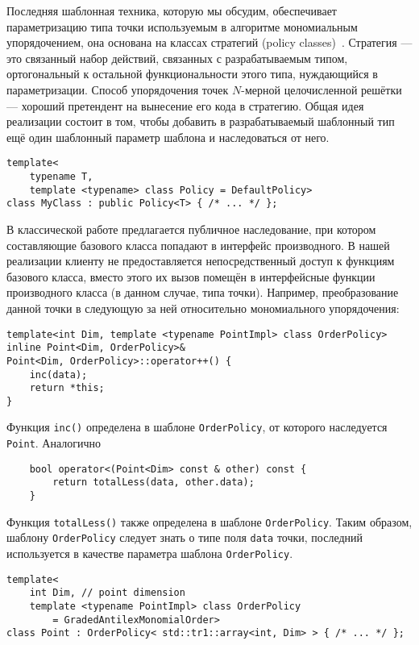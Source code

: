 \documentclass[14pt]{extarticle}
\newcommand{\nspace}{\hspace{0pt}}
\newcommand{\nbdash}{\nobreakdash-\nspace}
\begin{document}
Последняя шаблонная техника, которую мы обсудим, обеспечивает
параметризацию типа точки используемым в алгоритме мономиальным упорядочением,
она основана на классах стратегий (policy classes)~\cite[гл.~1]{Alexandrescu02}.
Стратегия — это связанный набор действий, связанных с разрабатываемым типом,
ортогональный к остальной функциональности этого типа, нуждающийся в
параметризации. Способ упорядочения точек $N$\nbdash{}мерной целочисленной
решётки — хороший претендент на вынесение его кода в стратегию. Общая идея
реализации состоит в том, чтобы добавить в разрабатываемый шаблонный тип ещё
один шаблонный параметр шаблона и наследоваться от него.
\begin{lstlisting}
template<
    typename T,
    template <typename> class Policy = DefaultPolicy>
class MyClass : public Policy<T> { /* ... */ };
\end{lstlisting}
В классической работе
\cite{Alexandrescu02} предлагается публичное наследование, при котором
составляющие базового класса попадают в интерфейс производного. В нашей
реализации клиенту не предоставляется непосредственный доступ к
функциям базового класса, вместо этого их вызов помещён в интерфейсные функции
производного класса (в данном случае, типа точки). Например, преобразование
данной точки в следующую за ней относительно мономиального упорядочения:
\begin{lstlisting}
template<int Dim, template <typename PointImpl> class OrderPolicy>
inline Point<Dim, OrderPolicy>&
Point<Dim, OrderPolicy>::operator++() {
    inc(data);
    return *this;
}
\end{lstlisting}
Функция \lstinline$inc()$ определена в шаблоне \lstinline$OrderPolicy$, от
которого наследуется \lstinline$Point$. Аналогично
\begin{lstlisting}
    bool operator<(Point<Dim> const & other) const {
        return totalLess(data, other.data);
    }
\end{lstlisting}
Функция \lstinline$totalLess()$ также определена в шаблоне
\lstinline$OrderPolicy$. Таким образом, шаблону \lstinline$OrderPolicy$ 
следует знать о типе поля \lstinline$data$ точки, последний используется
в качестве параметра шаблона \lstinline$OrderPolicy$.
\begin{lstlisting}
template<
    int Dim, // point dimension
    template <typename PointImpl> class OrderPolicy
        = GradedAntilexMonomialOrder>
class Point : OrderPolicy< std::tr1::array<int, Dim> > { /* ... */ };
\end{lstlisting}
\end{document}
